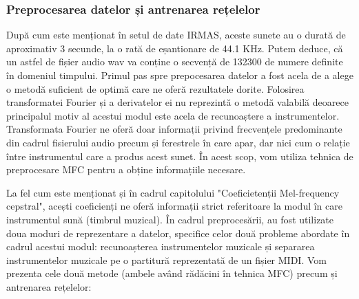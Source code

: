 \documentclass[a4paper,12pt]{report}
\begin{document}
   \subsubsection{Preprocesarea datelor și antrenarea rețelelor} 
   După cum este menționat în setul de date IRMAS, aceste sunete au o durată de aproximativ 3 secunde, la o rată de eșantionare de 44.1 KHz. Putem deduce, că un astfel de fișier audio wav va conține o secvență de 132300 de numere definite în domeniul timpului. Primul pas spre prepocesarea datelor a fost acela de a alege o metodă suficient de optimă care ne oferă rezultatele dorite. Folosirea transformatei Fourier și a derivatelor ei nu reprezintă o metodă valabilă deoarece principalul motiv al acestui modul este acela de recunoaștere a instrumentelor. Transformata Fourier ne oferă doar informații privind frecvențele predominante din cadrul fisierului audio precum și ferestrele în care apar, dar nici cum o relație între instrumentul care a produs acest sunet. În acest scop, vom utiliza tehnica de preprocesare MFC pentru a obține informațiile necesare.
   
   La fel cum este menționat și în cadrul capitolului "Coeficietenții Mel-frequency cepstral", acești coeficienți ne oferă informații strict referitoare la modul în care instrumentul sună (timbrul muzical). În cadrul preprocesării, au fost utilizate doua moduri de reprezentare a datelor, specifice celor două probleme abordate în cadrul acestui modul: recunoașterea instrumentelor muzicale și separarea instrumentelor muzicale pe o partitură reprezentată de un fișier MIDI. Vom prezenta cele două metode (ambele având rădăcini în tehnica MFC) precum și antrenarea rețelelor: 
   
\end{document}
